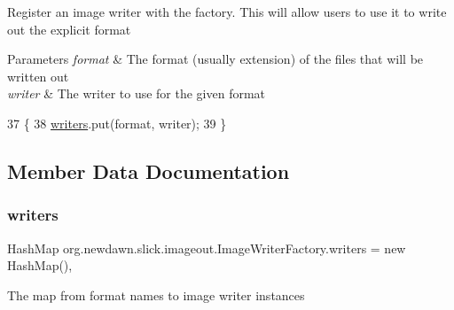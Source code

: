 Register an image writer with the factory. This will allow users to use it to write out the explicit format


\begin{DoxyParams}{Parameters}
{\em format} & The format (usually extension) of the files that will be written out \\
\hline
{\em writer} & The writer to use for the given format \\
\hline
\end{DoxyParams}

\begin{DoxyCode}
37                                                                          \{
38         \mbox{\hyperlink{classorg_1_1newdawn_1_1slick_1_1imageout_1_1_image_writer_factory_a93deff6a9953d95273a8a2a50520318d}{writers}}.put(format, writer);
39     \}
\end{DoxyCode}


\subsection{Member Data Documentation}
\mbox{\label{classorg_1_1newdawn_1_1slick_1_1imageout_1_1_image_writer_factory_a93deff6a9953d95273a8a2a50520318d}} 
\subsubsection{\texorpdfstring{writers}{writers}}
{\footnotesize\ttfamily Hash\+Map org.\+newdawn.\+slick.\+imageout.\+Image\+Writer\+Factory.\+writers = new Hash\+Map()\hspace{0.3cm}{\ttfamily [static]}, {\ttfamily [private]}}

The map from format names to image writer instances 